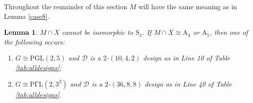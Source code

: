\documentclass[a4paper,twopage,reqno,12pt]{amsart}
\newtheorem{lemma}[theorem]{Lemma}
\theoremstyle{definition}
\numberwithin{equation}{section}
\newcommand{\PGL}{\mathrm{PGL}}
\newcommand{\PGaL}{\mathrm{P\Gamma L}}
\newcommand{\PSiL}{\mathrm{P \Sigma L}}
\newcommand{\A}{\mathrm{A}}
\renewcommand{\S}{\mathrm{S}}
\begin{document}
\bigskip

Throughout the remainder of this section $M$ will have the same meaning as in Lemma \ref{case8}.

\bigskip

\begin{lemma}\label{MintX456}
$M\cap X$ cannot be isomorphic to $\S_{4}$. If $M\cap X \cong \A_{4}$ or $\A_{5}$, then one of the following occurs:
\begin{enumerate}
    \item $G\cong \PGL(2,5)$ and $\mathcal{D}$ is a $2$-$(10,4,2)$ design as in Line 10 of Table \ref{tab:alldesigns}; 
    \item $G \cong \PGaL(2,3^{2})$ and $\mathcal{D}$ is a $2$-$(36,8,8)$ design as in Line 40 of Table \ref{tab:alldesigns}.
\end{enumerate}
\end{lemma}
\end{document}
